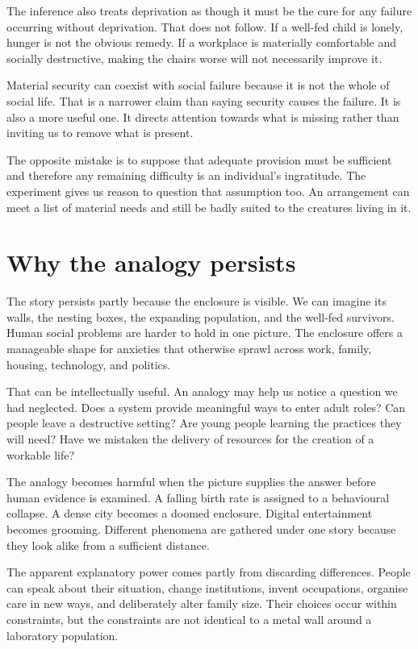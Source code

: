 \documentclass[12pt,a4paper]{book}
\begin{document}
The inference also treats deprivation as though it must be the cure for any failure occurring without deprivation. That does not follow. If a well-fed child is lonely, hunger is not the obvious remedy. If a workplace is materially comfortable and socially destructive, making the chairs worse will not necessarily improve it.

Material security can coexist with social failure because it is not the whole of social life. That is a narrower claim than saying security causes the failure. It is also a more useful one. It directs attention towards what is missing rather than inviting us to remove what is present.

The opposite mistake is to suppose that adequate provision must be sufficient and therefore any remaining difficulty is an individual's ingratitude. The experiment gives us reason to question that assumption too. An arrangement can meet a list of material needs and still be badly suited to the creatures living in it.

\section*{Why the analogy persists}

The story persists partly because the enclosure is visible. We can imagine its walls, the nesting boxes, the expanding population, and the well-fed survivors. Human social problems are harder to hold in one picture. The enclosure offers a manageable shape for anxieties that otherwise sprawl across work, family, housing, technology, and politics.

That can be intellectually useful. An analogy may help us notice a question we had neglected. Does a system provide meaningful ways to enter adult roles? Can people leave a destructive setting? Are young people learning the practices they will need? Have we mistaken the delivery of resources for the creation of a workable life?

The analogy becomes harmful when the picture supplies the answer before human evidence is examined. A falling birth rate is assigned to a behavioural collapse. A dense city becomes a doomed enclosure. Digital entertainment becomes grooming. Different phenomena are gathered under one story because they look alike from a sufficient distance.

The apparent explanatory power comes partly from discarding differences. People can speak about their situation, change institutions, invent occupations, organise care in new ways, and deliberately alter family size. Their choices occur within constraints, but the constraints are not identical to a metal wall around a laboratory population.
\end{document}
